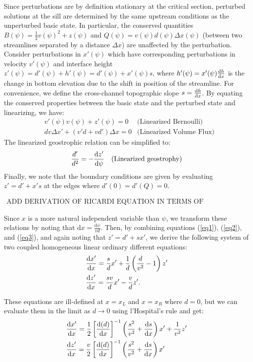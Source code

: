 \documentclass{jfm}
\begin{document}
Since perturbations are by definition stationary at the critical section, perturbed solutions at the sill are determined by the same upstream conditions as the unperturbed basic state. In particular, the conserved quantities $B(\psi) = \frac{1}{2}v(\psi)^{2} + z(\psi)$ and $Q(\psi) = v(\psi)d(\psi)\Delta x(\psi)$ (between two streamlines separated by a distance $\Delta x$) are unaffected by the perturbation. Consider perturbations in $x'(\psi)$ which have corresponding perturbations in velocity $v'(\psi)$ and interface height $z'(\psi) = d'(\psi) + h'(\psi) = d'(\psi) + x'(\psi)s$, where $h'(\psi)=x'(\psi)\dv{h}{x}$ is the change in bottom elevation due to the shift in position of the streamline. For convenience, we define the cross-channel topographic slope $s=\dv{h}{x}$. By equating the conserved properties between the basic state and the perturbed state and linearizing, we have:
\begin{align}
& v'(\psi)v(\psi) + z'(\psi) = 0 & \text{(Linearized Bernoulli)} \label{eq1} \\
& dv \Delta x' + (v'd+ vd') \Delta x = 0 & \text{(Linearized Volume Flux)} \label{eq2} 
\end{align}
The linearized geostrophic relation can be simplified to:
\begin{align}
& \frac{d'}{d^{2}} = - \dv{z'}{\psi} & \text{(Linearized geostrophy)} \label{eq3} 
\end{align}
Finally, we note that the boundary conditions are given by evaluating $z' = d' + x's$ at the edges where $d'(0)=d'(Q)=0$.

\begin{gather}
    \text{ADD DERIVATION OF RICARDI EQUATION IN TERMS OF STREAMFUNCTION}
\end{gather}

Since $x$ is a more natural independent variable than $\psi$, we transform these relations by noting that $\text{d}x = \frac{\text{d}\psi}{vd}$. Then, by combining equations (\ref{eq1}), (\ref{eq2}), and (\ref{eq3}), and again noting that $z'=d'+sx'$, we derive the following system of two coupled homogeneous linear ordinary different equations:
\begin{align}
& \dv{x'}{x} = \frac{s}{d}x' + \frac{1}{d} \left( \frac{d}{v^{2}} - 1 \right) z' \\
& \dv{z'}{x} = \frac{s v}{d} x' - \frac{v}{d}z'.
\end{align}

These equations are ill-defined at $x=x_{L}$ and $x=x_{R}$ where $d=0$, but we can evaluate them in the limit as $d\rightarrow 0$ using l'Hospital's rule and get:
\begin{align}
& \dv{x'}{x} = \frac{1}{2} \left[ \dv{(d)}{x} \right]^{-1} \left( \frac{s^{2}}{v^{2}} + \dv{s}{x} \right) x' + \frac{1}{v^{2}}z'\label{finitediff1} \\
& \dv{z'}{x} = \frac{v}{2} \left[ \dv{(d)}{x} \right]^{-1} \left( \frac{s^{2}}{v^{2}} + \dv{s}{x} \right) x'\label{finitediff2}
\end{align}
\end{document}
